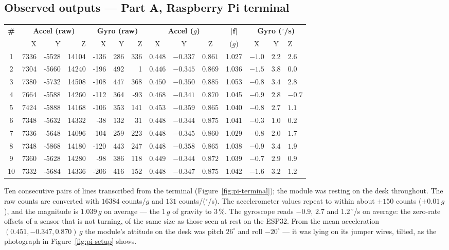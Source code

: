 \documentclass[10pt,a4paper]{article}
\begin{document}
\subsection*{Observed outputs --- Part A, Raspberry Pi terminal}

\vspace{2pt}
\noindent
{\small
\begin{tabularx}{\textwidth}{@{}c r r r r r r c c c c c c >{\centering\arraybackslash}X@{}}
\toprule
\rowcolor{soft}
\textbf{\#} & \multicolumn{3}{c}{\textbf{Accel (raw)}} & \multicolumn{3}{c}{\textbf{Gyro (raw)}} & \multicolumn{3}{c}{\textbf{Accel ($g$)}} & $|\mathbf f|$ & \multicolumn{3}{c}{\textbf{Gyro ($^{\circ}$/s)}} \\
\rowcolor{soft}
 & X & Y & Z & X & Y & Z & X & Y & Z & ($g$) & X & Y & Z \\
\midrule
1 & 7336 & -5528 & 14104 & -136 & 286 & 336 & $0.448$ & $-0.337$ & $0.861$ & 1.027 & $-1.0$ & $2.2$ & $2.6$ \\
2 & 7304 & -5660 & 14240 & -196 & 492 & 1 & $0.446$ & $-0.345$ & $0.869$ & 1.036 & $-1.5$ & $3.8$ & $0.0$ \\
3 & 7380 & -5732 & 14508 & -108 & 447 & 368 & $0.450$ & $-0.350$ & $0.885$ & 1.053 & $-0.8$ & $3.4$ & $2.8$ \\
4 & 7664 & -5588 & 14260 & -112 & 364 & -93 & $0.468$ & $-0.341$ & $0.870$ & 1.045 & $-0.9$ & $2.8$ & $-0.7$ \\
5 & 7424 & -5888 & 14168 & -106 & 353 & 141 & $0.453$ & $-0.359$ & $0.865$ & 1.040 & $-0.8$ & $2.7$ & $1.1$ \\
6 & 7348 & -5632 & 14332 & -38 & 132 & 31 & $0.448$ & $-0.344$ & $0.875$ & 1.041 & $-0.3$ & $1.0$ & $0.2$ \\
7 & 7336 & -5648 & 14096 & -104 & 259 & 223 & $0.448$ & $-0.345$ & $0.860$ & 1.029 & $-0.8$ & $2.0$ & $1.7$ \\
8 & 7348 & -5868 & 14180 & -120 & 443 & 247 & $0.448$ & $-0.358$ & $0.865$ & 1.038 & $-0.9$ & $3.4$ & $1.9$ \\
9 & 7360 & -5628 & 14280 & -98 & 386 & 118 & $0.449$ & $-0.344$ & $0.872$ & 1.039 & $-0.7$ & $2.9$ & $0.9$ \\
10 & 7332 & -5684 & 14336 & -206 & 416 & 152 & $0.448$ & $-0.347$ & $0.875$ & 1.042 & $-1.6$ & $3.2$ & $1.2$ \\
\bottomrule
\end{tabularx}}

\vspace{6pt}
\noindent Ten consecutive pairs of lines transcribed from the terminal
(Figure~\ref{fig:pi-terminal}); the module was resting on the desk throughout. The
raw counts are converted with $16384$ counts/$g$ and $131$ counts/($^{\circ}$/s). The
accelerometer values repeat to within about $\pm150$ counts ($\pm0.01\,g$), and the
magnitude is $1.039\,g$ on average --- the $1\,g$ of gravity to $3\,\%$. The
gyroscope reads $-0.9$, $2.7$ and $1.2\,^{\circ}$/s on average:
the zero-rate offsets of a sensor that is not turning, of the same size as those seen
at rest on the ESP32. From the mean acceleration $(0.451, -0.347, 0.870)\,g$
the module's attitude on the desk was pitch $26^{\circ}$ and roll
$-20^{\circ}$ --- it was lying on its jumper wires, tilted, as the
photograph in Figure~\ref{fig:pi-setup} shows.
\end{document}
